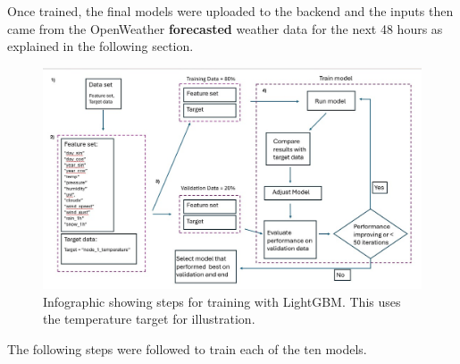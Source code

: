 Once trained, the final models were uploaded to the backend and the inputs then
came from the OpenWeather \textbf{forecasted} weather data for the next 48 hours
as explained in the following section.

\begin{figure}[H]
    \centering
    \includegraphics[width=1\textwidth]{contents/part-3/fig3/machine-learning-diagram2.jpg}
    \caption{Infographic showing steps for training with LightGBM. This uses the temperature target for illustration.}
    \label{fig:machine_diagram}
\end{figure}

The following steps were followed to train each of the ten models.

